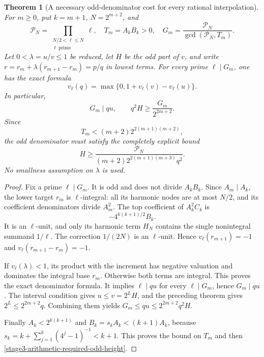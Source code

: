 \documentclass[11pt,a4paper]{article}
\newtheorem{theorem}{Theorem}[section]
\theoremstyle{definition}
\theoremstyle{remark}
\begin{document}
\begin{theorem}[A necessary odd-denominator cost for every rational interpolation]
\label{stage3-arithmetic-odd-cost}
For $m\ge0$, put $k=m+1$, $N=2^{m+2}$, and
\[
 \mathcal P_N=\prod_{\substack{N/2<\ell\le N\\\ell\ \mathrm{prime}}}\ell,
 \quad T_m=A_kB_k>0,
 \quad G_m=\frac{\mathcal P_N}{\gcd(\mathcal P_N,T_m)}.
\]
Let $0<\lambda=u/v\le1$ be reduced, let $H$ be the odd part of $v$,
and write $r=r_m+\lambda(r_{m+1}-r_m)=p/q$ in lowest terms.
For every prime $\ell\mid G_m$, one has the exact formula
\[
 v_\ell(q)=\max\{0,1+v_\ell(v)-v_\ell(u)\}.
\]
In particular,
\begin{equation}\label{stage3-arithmetic-prime-divisibility}
 G_m\mid qu,
 \qquad
 q^2H\ge\frac{G_m}{2^{2m+2}}.
\end{equation}
Since
\[
 T_m<(m+2)2^{2(m+1)(m+2)},
\]
the odd denominator must satisfy the completely explicit bound
\begin{equation}\label{stage3-arithmetic-required-odd-height}
 H\ge
 \frac{\mathcal P_N}
 {(m+2)2^{2(m+1)(m+3)}q^2}.
\end{equation}
No smallness assumption on $\lambda$ is used.
\end{theorem}

\begin{proof}
Fix a prime $\ell\mid G_m$. It is odd and does not divide $A_kB_k$.
Since $A_m\mid A_k$, the lower target $r_m$ is $\ell$-integral:
all its harmonic nodes are at most $N/2$, and its coefficient
denominators divide $A_m^2$. The top coefficient of $A_k^2C_k$ is
\[
 -4^{k(k+1)/2}B_k.
\]
It is an $\ell$-unit, and only its harmonic term $H_N$ contains the
single nonintegral summand $1/\ell$. The correction $1/(2N)$ is an
$\ell$-unit. Hence $v_\ell(r_{m+1})=-1$ and
$v_\ell(r_{m+1}-r_m)=-1$.

If $v_\ell(\lambda)<1$, its product with the increment has negative
valuation and dominates the integral base $r_m$. Otherwise both terms
are integral. This proves the exact denominator formula. It implies
$\ell\mid qu$ for every $\ell\mid G_m$, hence $G_m\mid qu$.
The interval condition gives $u\le v=2^LH$, and the preceding theorem
gives $2^L\le2^{2m+2}q$. Combining them yields
$G_m\le qu\le2^{2m+2}q^2H$.

Finally $A_k<2^{k(k+1)}$ and
$B_k=s_kA_k<(k+1)A_k$, because
$s_k=k+\sum_{j=1}^k(4^j-1)^{-1}<k+1$.
This proves the bound on $T_m$ and then
\eqref{stage3-arithmetic-required-odd-height}.
\end{proof}
\end{document}
